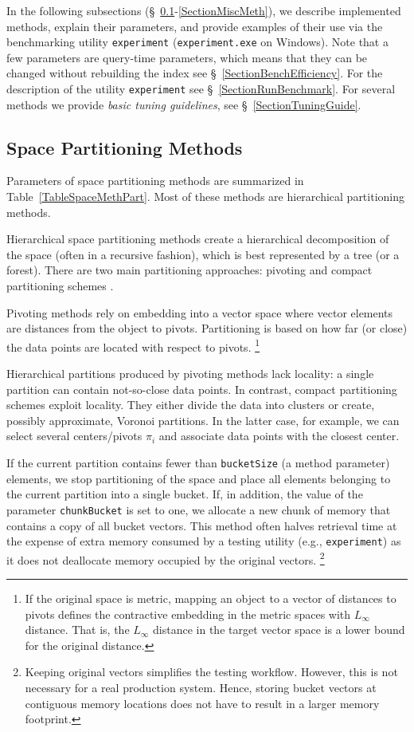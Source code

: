 \documentclass[runningheads,a4paper]{llncs}
\newcommand{\ttt}[1]{\texttt{#1}}
\begin{document}
{In the following subsections (\S~\ref{SectionSpacePartMeth}-\ref{SectionMiscMeth}),
we describe implemented methods, explain their parameters,
and provide examples of their use via the benchmarking utility \ttt{experiment} (\ttt{experiment.exe} on Windows).
Note that a few parameters are query-time parameters, which means that they 
can be changed without rebuilding the index see \S~\ref{SectionBenchEfficiency}.
For the description of the utility \ttt{experiment} see \S~\ref{SectionRunBenchmark}.
For several methods we provide \emph{basic tuning guidelines}, see \S~\ref{SectionTuningGuide}.

\subsection{Space Partitioning Methods} \label{SectionSpacePartMeth} 
Parameters of space partitioning methods are summarized in Table~\ref{TableSpaceMethPart}.
Most of these methods are hierarchical partitioning methods.

Hierarchical space partitioning methods create a hierarchical decomposition of the space
(often in a recursive fashion),
which is best represented by a tree (or a forest). 
There are two main partitioning approaches: 
pivoting and compact partitioning schemes  \cite{Chavez_et_al:2001a}.

Pivoting methods rely on embedding into a vector space where vector elements are distances
from the object to pivots.
Partitioning is based on how far (or close) the data points are located with respect to pivots.
\footnote{If the original space is metric, mapping an object to a vector of distances to pivots 
defines the contractive embedding in the metric spaces with $L_{\infty}$ distance.
That is, the $L_{\infty}$ distance in the target vector space is a lower bound for the original distance.}

Hierarchical partitions produced by pivoting methods lack locality: a single partition can contain
not-so-close data points. In contrast, compact partitioning schemes exploit locality.
They either divide the data into clusters or create, possibly approximate, Voronoi partitions.
In the latter case, for example, we can select several centers/pivots $\pi_i$ and associate 
data points with the closest center.

If the current partition contains fewer than \ttt{bucketSize} (a method parameter) elements,
we stop partitioning of the space and place all elements
belonging to the current partition into a single bucket. 
If, in addition, the value of the parameter \ttt{chunkBucket} is set to one,
we allocate a new chunk of memory that contains a copy of all bucket vectors.
This method often halves retrieval time
at the expense of extra memory consumed by a testing utility (e.g., \ttt{experiment}) as it does not deallocate memory occupied by the original vectors. \footnote{Keeping original vectors simplifies the testing workflow.
However, this is not necessary for a real production system.
Hence, storing bucket vectors at contiguous memory locations does not have to result in a larger memory footprint.}

}
\end{document}
